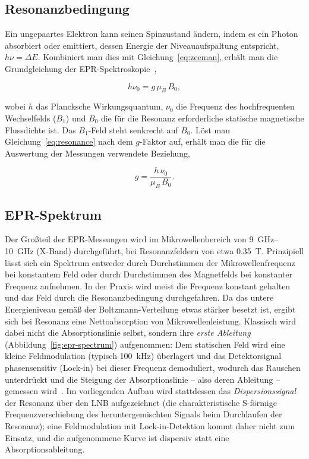 \documentclass[11pt,a4paper]{article}
\begin{document}
\subsection{Resonanzbedingung}
Ein ungepaartes Elektron kann seinen Spinzustand ändern, indem es ein Photon
absorbiert oder emittiert, dessen Energie der Niveauaufspaltung entspricht,
$h\nu = \Delta E$. Kombiniert man dies mit Gleichung~\eqref{eq:zeeman}, erhält
man die Grundgleichung der EPR-Spektroskopie~\cite{eprmanual,demtroeder3},

\begin{equation}
    h\nu_0 = g\,\mu_B\,B_0 ,
    \label{eq:resonance}
\end{equation}

wobei $h$ das Plancksche Wirkungsquantum, $\nu_0$ die Frequenz des
hochfrequenten Wechselfelds ($B_1$) und $B_0$ die für die Resonanz
erforderliche statische magnetische Flussdichte ist. Das $B_1$-Feld steht
senkrecht auf $B_0$. Löst man Gleichung~\eqref{eq:resonance} nach dem
$g$-Faktor auf, erhält man die für die Auswertung der Messungen verwendete
Beziehung,

\begin{equation}
    g = \frac{h\,\nu_0}{\mu_B\,B_0} .
    \label{eq:gfactor}
\end{equation}

\subsection{EPR-Spektrum}
Der Großteil der EPR-Messungen wird im Mikrowellenbereich von
\SIrange{9}{10}{\giga\hertz} (X-Band) durchgeführt, bei Resonanzfeldern von
etwa \SI{0.35}{\tesla}. Prinzipiell lässt sich ein Spektrum entweder durch
Durchstimmen der Mikrowellenfrequenz bei konstantem Feld oder durch
Durchstimmen des Magnetfelds bei konstanter Frequenz aufnehmen. In der Praxis
wird meist die Frequenz konstant gehalten und das Feld durch die
Resonanzbedingung durchgefahren. Da das untere Energieniveau gemäß der
Boltzmann-Verteilung etwas stärker besetzt ist, ergibt sich bei Resonanz eine
Nettoabsorption von Mikrowellenleistung. Klassisch wird dabei nicht die
Absorptionslinie selbst, sondern ihre \emph{erste Ableitung}
(Abbildung~\ref{fig:epr-spectrum}) aufgenommen: Dem statischen Feld wird eine
kleine Feldmodulation (typisch \SI{100}{\kilo\hertz}) überlagert und das
Detektorsignal phasensensitiv (Lock-in) bei dieser Frequenz demoduliert,
wodurch das Rauschen unterdrückt und die Steigung der Absorptionslinie --
also deren Ableitung -- gemessen wird~\cite{eprmanual,weilbolton}. Im
vorliegenden Aufbau wird stattdessen das \emph{Dispersionssignal} der Resonanz
über den LNB aufgezeichnet (die charakteristische S-förmige
Frequenzverschiebung des heruntergemischten Signals beim Durchlaufen der
Resonanz); eine Feldmodulation mit Lock-in-Detektion kommt daher nicht zum
Einsatz, und die aufgenommene Kurve ist dispersiv statt eine
Absorptionsableitung.
\end{document}
